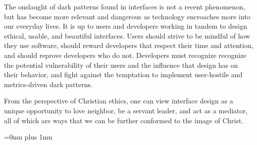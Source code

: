 \documentclass[12pt, oneside]{article}
\begin{document}
The onslaught of dark patterns found in interfaces is not a recent phenomenon, but has become more relevant and dangerous as technology encroaches more into our everyday lives. It is up to users and developers working in tandem to design ethical, usable, and beautiful interfaces. Users should strive to be mindful of how they use software, should reward developers that respect their time and attention, and should reprove developers who do not. Developers must recognize recognize the potential vulnerability of their users and the influence that design has on their behavior, and fight against the temptation to implement user-hostile and metrics-driven dark patterns.

From the perspective of Christian ethics, one can view interface design as a unique opportunity to love neighbor, be a servant leader, and act as a mediator, all of which are ways that we can be further conformed to the image of Christ.

\newpage

\begingroup
\raggedright
\Urlmuskip=0mu plus 1mu\relax

 


\endgroup
\end{document}
